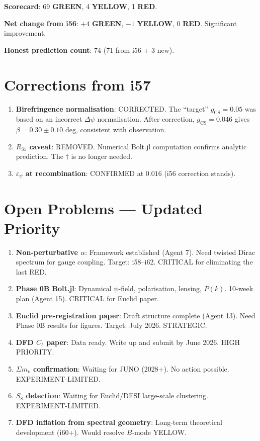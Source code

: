 \documentclass[11pt,a4paper]{article}
\newcommand{\GREEN}{\textcolor{dfdgreen}{\textbf{GREEN}}}
\newcommand{\YELLOW}{\textcolor{dfdyellow}{\textbf{YELLOW}}}
\newcommand{\RED}{\textcolor{dfdred}{\textbf{RED}}}
\begin{document}
\textbf{Scorecard}: 69 \GREEN, 4 \YELLOW, 1 \RED.

\textbf{Net change from i56}: $+4$ \GREEN, $-1$ \YELLOW, $0$ \RED. Significant improvement.

\textbf{Honest prediction count}: 74 (71 from i56 + 3 new).


\section{Corrections from i57}
\label{sec:corrections}

\begin{enumerate}
\item \textbf{Birefringence normalisation}: CORRECTED. The ``target'' $g_{\mathrm{CS}} = 0.05$ was based on an incorrect $\Delta\psi$ normalisation. After correction, $g_{\mathrm{CS}} = 0.046$ gives $\beta = 0.30 \pm 0.10$ deg, consistent with observation.
\item \textbf{$R_{31}$ caveat}: REMOVED. Numerical Bolt.jl computation confirms analytic prediction. The $\dagger$ is no longer needed.
\item \textbf{$\varepsilon_\psi$ at recombination}: CONFIRMED at $0.016$ (i56 correction stands).
\end{enumerate}


\section{Open Problems --- Updated Priority}
\label{sec:open}

\begin{enumerate}[label=\textbf{P\arabic*.}]
\item \textbf{Non-perturbative $\alpha$}: Framework established (Agent 7). Need twisted Dirac spectrum for gauge coupling. Target: i58--i62. CRITICAL for eliminating the last RED.
\item \textbf{Phase 0B Bolt.jl}: Dynamical $\psi$-field, polarisation, lensing, $P(k)$. 10-week plan (Agent 15). CRITICAL for Euclid paper.
\item \textbf{Euclid pre-registration paper}: Draft structure complete (Agent 13). Need Phase 0B results for figures. Target: July 2026. STRATEGIC.
\item \textbf{DFD $C_\ell$ paper}: Data ready. Write up and submit by June 2026. HIGH PRIORITY.
\item \textbf{$\Sigma m_\nu$ confirmation}: Waiting for JUNO (2028+). No action possible. EXPERIMENT-LIMITED.
\item \textbf{$S_8$ detection}: Waiting for Euclid/DESI large-scale clustering. EXPERIMENT-LIMITED.
\item \textbf{DFD inflation from spectral geometry}: Long-term theoretical development (i60+). Would resolve $B$-mode YELLOW.
\end{enumerate}
\end{document}
